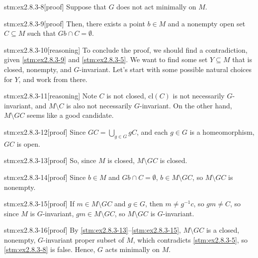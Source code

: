 \begin{stm}{stm:ex2.8.3-8}[proof]
Suppose that $G$ does not act minimally on $M$.
\end{stm}

\begin{stm}{stm:ex2.8.3-9}[proof]
Then, there exists a point $b \in M$ and a nonempty open set $C \subseteq M$ such that $Gb \cap C = \emptyset$.
\end{stm}

\begin{stm}{stm:ex2.8.3-10}[reasoning]
To conclude the proof, we should find a contradiction, given \ref{stm:ex2.8.3-9} and \ref{stm:ex2.8.3-5}. We want to find some set $Y \subseteq M$ that is closed, nonempty, and $G$-invariant. Let's start with some possible natural choices for $Y$, and work from there.
\end{stm}

\begin{stm}{stm:ex2.8.3-11}[reasoning]
Note $C$ is not closed, $\text{cl}(C)$ is not necessarily $G$-invariant, and $M \setminus C$ is also not necessarily $G$-invariant. On the other hand, $M \setminus GC$ seems like a good candidate.
\end{stm}

\begin{stm}{stm:ex2.8.3-12}[proof]
Since $GC = \bigcup_{g \in G} gC$, and each $g \in G$ is a homeomorphism, $GC$ is open.
\end{stm}

\begin{stm}{stm:ex2.8.3-13}[proof]
So, since $M$ is closed, $M \setminus GC$ is closed.
\end{stm}

\begin{stm}{stm:ex2.8.3-14}[proof]
Since $b \in M$ and $Gb \cap C = \emptyset$, $b \in M \setminus GC$, so $M \setminus GC$ is nonempty.
\end{stm}

\begin{stm}{stm:ex2.8.3-15}[proof]
If $m \in M \setminus GC$ and $g \in G$, then $m \ne g^{-1}c$, so $gm \ne C$, so since $M$ is $G$-invariant, $gm \in M \setminus GC$, so $M \setminus GC$ is $G$-invariant.
\end{stm}

\begin{stm}{stm:ex2.8.3-16}[proof]
By \ref{stm:ex2.8.3-13}–\ref{stm:ex2.8.3-15}, $M \setminus GC$ is a closed, nonempty, $G$-invariant proper subset of $M$, which contradicts \ref{stm:ex2.8.3-5}, so \ref{stm:ex2.8.3-8} is false. Hence, $G$ acts minimally on $M$.
\end{stm}